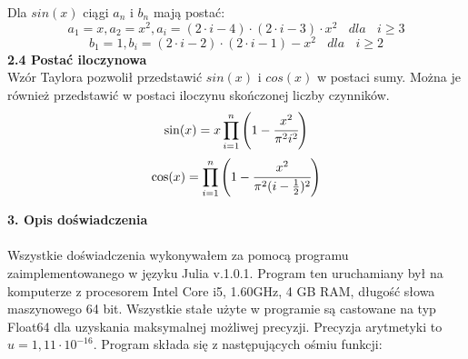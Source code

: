 \documentclass[a4paper]{article}
\begin{document}
Dla $sin(x)$ ciągi ${a_n}$ i ${b_n}$ mają postać:
\begin{equation}\label{sinfrac}
a_1 = x , a_2 = x^2 , a_i = (2 \cdot i - 4) \cdot (2 \cdot i - 3) \cdot x^2 \ \ \ \  dla \ \ \ \  i \geq 3
\end{equation}
\begin{equation}\label{sinfrac2}
b_1 = 1 , b_i = (2 \cdot i - 2) \cdot (2 \cdot i - 1) - x^2 \ \ \ \ dla \ \ \ \ i \geq 2
\end{equation}
\large
\textbf{2.4 Postać iloczynowa}\\
\normalsize
Wzór Taylora pozwolił przedstawić $sin(x)$ i $cos(x)$ w postaci sumy. Można je również przedstawić w postaci iloczynu skończonej liczby czynników.\cite{WI}
\begin{equation}\label{sinmult}
\sin (x)=x\prod _{{i=1}}^{n}\left(1-{\cfrac {x^{2}}{\pi ^{2}i^{2}}}\right)
\end{equation}
\begin{equation}\label{cosmult}
\cos (x)=\prod _{{i=1}}^{n}\left(1-{\cfrac {x^{2}}{\pi ^{2}(i-{\frac {1}{2}})^{2}}}\right)
\end{equation}

\Large
\textbf{3. Opis doświadczenia}\\\\
\normalsize
Wszystkie doświadczenia wykonywałem za pomocą programu zaimplementowanego w języku Julia v.1.0.1. Program ten uruchamiany był na komputerze z procesorem Intel Core i5, 1.60GHz, 4 GB RAM, długość słowa maszynowego 64 bit. Wszystkie stałe użyte w programie są castowane na typ Float64 dla uzyskania maksymalnej możliwej precyzji. Precyzja arytmetyki to $u = 1,11 \cdot 10^{-16}$. Program składa się z następujących ośmiu funkcji:
\end{document}
